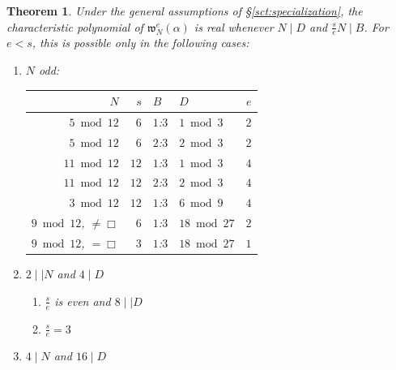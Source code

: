 \documentclass[12pt,twoside,leqno]{article}
\newtheorem{theorem}{Theorem}[section]
\numberwithin{equation}{section}
\newcommand{\w}{\mathfrak w}
\newenvironment {alphenumerate}
   {\renewcommand {\labelenumi}{(\alph {enumi})}
    \renewcommand {\labelenumii}{(\alph {enumi}\arabic {enumii})}
    \begin {enumerate}}
   {\end {enumerate}}
\begin{document}
\begin {theorem}
\label {th:lowreality}
Under the general assumptions of \S\ref {sct:specialization},
the characteristic polynomial of $\w_N^e (\alpha)$ is real
whenever $N \mid D$ and $\frac {s}{e} N \mid B$.
For $e < s$, this is possible only in the following cases:
\begin {alphenumerate}
\item
$N$ odd:
\begin{center}
\begin{tabular}{|r|r||l|l||r|}\hline
$N$                    &  $s$ & $B$ & $D$             & $e$ \\
\hline
$ 5 \bmod 12$          &  $6$ & $1$:$3$ & $1\bmod 3$  & $2$ \\
$ 5 \bmod 12$          &  $6$ & $2$:$3$ & $2\bmod 3$  & $2$ \\
\hline
$11 \bmod 12$          & $12$ & $1$:$3$ & $1\bmod 3$  & $4$ \\
$11 \bmod 12$          & $12$ & $2$:$3$ & $2\bmod 3$  & $4$ \\
\hline
$ 3 \bmod 12$          & $12$ & $1$:$3$ & $6 \bmod 9$ & $4$ \\
\hline
$9\bmod12$, $\neq\Box$ &  $6$ & $1$:$3$ & $18 \bmod 27$ & $2$ \\
$9\bmod12$, $= \Box$   &  $3$ & $1$:$3$ & $18 \bmod 27$ & $1$ \\
\hline
\end {tabular}
\end {center}
\item
$2 \mid\mid N$ and $4 \mid D$
\begin {alphenumerate}
\item
$\frac {s}{e}$ is even and $8 \mid\mid D$
\item
$\frac {s}{e} = 3$
\end {alphenumerate}
\item
$4 \mid N$ and $16 \mid D$
\end {alphenumerate}
\end {theorem}
\end{document}
